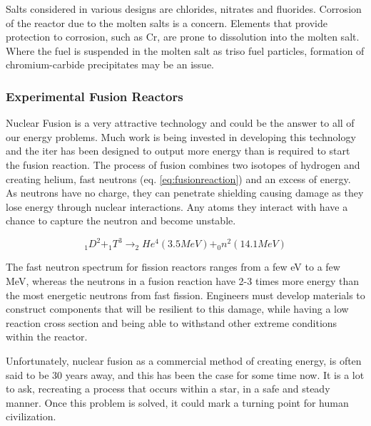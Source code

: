 Salts considered in various designs are chlorides, nitrates and fluorides.  Corrosion of the reactor due to the molten salts is a concern.  Elements that provide protection to corrosion, such as Cr, are prone to dissolution into the molten salt\cite{msrcorrosion}.  Where the fuel is suspended in the molten salt as \acrfull{triso} fuel particles, formation of chromium-carbide precipitates may be an issue.


\FloatBarrier
\subsubsection{Experimental Fusion Reactors}

Nuclear Fusion is a very attractive technology and could be the answer to all of our energy problems.  Much work is being invested in developing this technology and the \acrfull{iter} has been designed to output more energy than is required to start the fusion reaction.  The process of fusion combines two isotopes of hydrogen and creating helium, fast neutrons (eq. \ref{eq:fusionreaction}) and an excess of energy.  As neutrons have no charge, they can penetrate shielding causing damage as they lose energy through nuclear interactions.   Any atoms they interact with have a chance to capture the neutron and become unstable.

\begin{equation}
_{1}D^{2} + _{1}T^{3} \to _{2}He^{4} (3.5MeV) + _{0}n^{2} (14.1MeV)
\label{eq:fusionreaction}
\end{equation}

The fast neutron spectrum for fission reactors ranges from a few eV to a few MeV, whereas the neutrons in a fusion reaction have 2-3 times more energy than the most energetic neutrons from fast fission.  Engineers must develop materials to construct components that will be resilient to this damage, while having a low reaction cross section and being able to withstand other extreme conditions within the reactor.  

Unfortunately, nuclear fusion as a commercial method of creating energy, is often said to be 30 years away, and this has been the case for some time now.  It is a lot to ask, recreating a process that occurs within a star, in a safe and steady manner.  Once this problem is solved, it could mark a turning point for human civilization.






